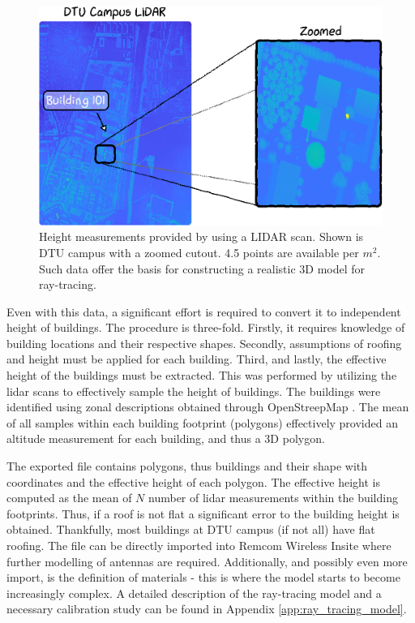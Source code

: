 \begin{figure}
    \centering
    \includegraphics[width=\textwidth]{chapters/part_pathloss/figures/LIDAR_example.eps}
    \caption{Height measurements provided by \cite{kortforsyningen} using a LIDAR scan. Shown is DTU campus with a zoomed cutout. 4.5 points are available per $m^2$. Such data offer the basis for constructing a realistic 3D model for ray-tracing.}
    \label{fig:lidar_data_example}
\end{figure}

Even with this data, a significant effort is required to convert it to independent height of buildings. The procedure is three-fold. Firstly, it requires knowledge of building locations and their respective shapes. Secondly, assumptions of roofing and height must be applied for each building. Third, and lastly, the effective height of the buildings must be extracted. This was performed by utilizing the \gls{lidar} scans to effectively sample the height of buildings. The buildings were identified using zonal descriptions obtained through OpenStreepMap \cite{OpenstreetMapWiki}. The mean of all samples within each building footprint (polygons) effectively provided an altitude measurement for each building, and thus a 3D polygon.

The exported file contains polygons, thus buildings and their shape with coordinates and the effective height of each polygon. The effective height is computed as the mean of $N$ number of \gls{lidar} measurements within the building footprints. Thus, if a roof is not flat a significant error to the building height is obtained. Thankfully, most buildings at DTU campus (if not all) have flat roofing. The file can be directly imported into Remcom Wireless Insite where further modelling of antennas are required. Additionally, and possibly even more import, is the definition of materials - this is where the model starts to become increasingly complex. A detailed description of the ray-tracing model and a necessary calibration study can be found in Appendix \ref{app:ray_tracing_model}.


